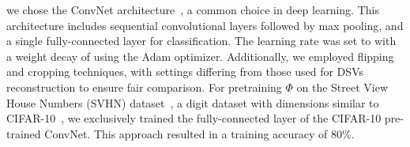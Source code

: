  we chose the ConvNet architecture~\cite{convnet}, a common choice in deep learning. This architecture includes sequential convolutional layers followed by max pooling, and a single fully-connected layer for classification. The learning rate was set to  with a weight decay of  using the Adam optimizer. Additionally, we employed flipping and cropping techniques, with settings differing from those used for DSVs reconstruction to ensure fair comparison. For pretraining \(\Phi\) on the Street View House Numbers (SVHN) dataset~\cite{dataset:svhn}, a digit dataset with dimensions similar to CIFAR-10~\cite{dataset:cifar10}, we exclusively trained the fully-connected layer of the CIFAR-10 pre-trained ConvNet. This approach resulted in a training accuracy of 80\%. 



